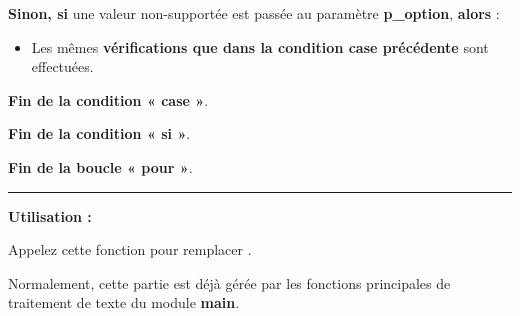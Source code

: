 \documentclass[a4paper,10pt]{article}
\begin{document}
\begin{itemize}
{\begin{itemize}
{                    \begin{justify}
                        \textbf{\color{case}Sinon, si} une valeur non-supportée est passée au paramètre \textbf{\color{vars}p\_option}, \textbf{\color{case}alors} :
                    \end{justify}

                    \setlength{\parskip}{1em}

                    \begin{itemize}
                        \item
                        {
                            \begin{justify}
                                Les mêmes \textbf{\color{cond}vérifications que \color{case}dans la condition case précédente} sont effectuées.
                            \end{justify}
                        }
                    \end{itemize}

                    \begin{justify}
                        \textbf{\color{case}Fin de la condition « case »}.
                    \end{justify}
                }
            \end{itemize}

            \begin{justify}
                \textbf{\color{cond}Fin de la condition « si »}.
            \end{justify}
        }
    \end{itemize}

    \begin{justify}
        \textbf{\color{loop}Fin de la boucle « pour »}.
    \end{justify}

    \setlength{\parskip}{1em}


    \par\noindent\rule{\textwidth}{0.4pt}

    \begin{justify}
        \textbf{Utilisation :}

        Appelez cette fonction pour remplacer .
    \end{justify}

    \begin{justify}
        Normalement, cette partie est déjà gérée par les fonctions principales de traitement de texte du module \textbf{main}.
    \end{justify}
\end{document}
